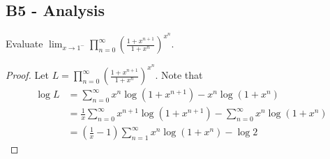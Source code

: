 \documentclass[11pt]{scrartcl}
\newcommand{\<}{\langle}
\renewcommand{\>}{\rangle}
\begin{document}
\subsection{B5 - Analysis}
Evaluate $\lim_{x\to 1^-}\prod_{n=0}^{\infty}\left(\frac{1+x^{n+1}}{1+x^n}\right)^{x^n}$.
\begin{proof}
Let $L = \prod_{n=0}^{\infty}\left(\frac{1+x^{n+1}}{1+x^n}\right)^{x^n}$.  Note that 
\begin{align*}
\log L &= \sum_{n=0}^{\infty} x^n \log (1 + x^{n + 1}) - x^n \log (1 + x^n) \\
&= \frac{1}{x}\sum_{n=0}^{\infty} x^{n+1} \log (1 + x^{n+1})  - \sum_{n=0}^{\infty} x^n \log(1 + x^n) \\
&=\left (\frac{1}{x} - 1 \right) \sum_{n=1}^\infty x^n \log(1 + x^n) - \log 2
\end{align*}
\end{proof}
\pagebreak
\end{document}
